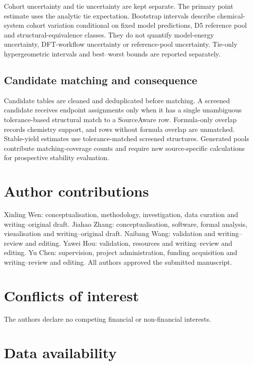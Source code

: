\documentclass[twoside,twocolumn,9pt]{article}
\begin{document}
Cohort uncertainty and tie uncertainty are kept separate. The primary point estimate uses the analytic tie expectation. Bootstrap intervals describe chemical-system cohort variation conditional on fixed model predictions, D5 reference pool and structural-equivalence classes. They do not quantify model-energy uncertainty, DFT-workflow uncertainty or reference-pool uncertainty. Tie-only hypergeometric intervals and best--worst bounds are reported separately.



\subsection{Candidate matching and consequence}

Candidate tables are cleaned and deduplicated before matching. A screened candidate receives endpoint assignments only when it has a single unambiguous tolerance-based structural match to a SourceAware row. Formula-only overlap records chemistry support, and rows without formula overlap are unmatched. Stable-yield estimates use tolerance-matched screened structures. Generated pools contribute matching-coverage counts and require new source-specific calculations for prospective stability evaluation.

\section*{Author contributions}

Xinling Wen: conceptualisation, methodology, investigation, data curation and writing--original draft. Jiahao Zhang: conceptualisation, software, formal analysis, visualisation and writing--original draft. Naibang Wang: validation and writing--review and editing. Yawei Hou: validation, resources and writing--review and editing. Yu Chen: supervision, project administration, funding acquisition and writing--review and editing. All authors approved the submitted manuscript.

\section*{Conflicts of interest}

The authors declare no competing financial or non-financial interests.

\section*{Data availability}
\end{document}
